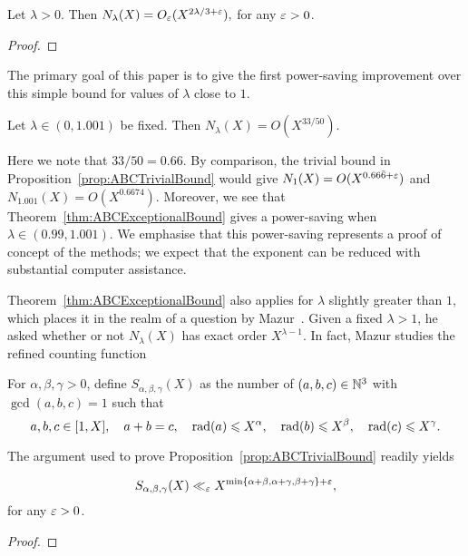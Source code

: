 \begin{proposition}\label{prop:ABCTrivialBound}
Let $\lambda>0$. Then
$
N_\lambda(X)=O_\varepsilon( X^{2\lambda/3+\varepsilon}),
$
for any $\varepsilon>0$.
\end{proposition}
\begin{proof}
\end{proof}


The primary goal of this paper is to give the first power-saving improvement over this simple bound for values of $\lambda$ close to $1$.


\begin{theorem}\label{thm:ABCExceptionalBound}
Let $\lambda\in (0, 1.001)$ be fixed. Then
$N_\lambda(X)=O( X^{33/50})$.
\end{theorem}

Here we note that $33/50=0.66$. By comparison, the trivial bound in Proposition~\ref{prop:ABCTrivialBound} would give $N_1(X)=O(X^{0.66\bar{6}+\varepsilon})$ and $N_{1.001}(X)=O(X^{0.6674})$.
Moreover, we see that Theorem~\ref{thm:ABCExceptionalBound} gives a power-saving when $\lambda\in (0.99,1.001)$. We emphasise that this power-saving represents a proof of concept of the methods; we expect that the exponent can be reduced with substantial computer assistance.


 Theorem~\ref{thm:ABCExceptionalBound} also applies for $\lambda$ slightly greater than $1$,
 which places it in the realm of a question by Mazur~\cite{mazur}.
Given a fixed $\lambda>1$, he asked whether or not
$ N_\lambda(X)$ has exact order
 $ X^{\lambda-1}$.
 In fact, Mazur studies
 the refined counting function

\begin{definition}\label{def:Sabc}
For $\alpha,\beta,\gamma>0$, define $S_{\alpha,\beta,\gamma}(X)$
as the number of
 $(a,b,c)\in \mathbb{N}^3$
with $\gcd(a,b,c)=1$ such that
 \[
 a,b,c\in [1,X], \quad a+b=c, \quad \operatorname{rad}(a)\leqslant X^\alpha, \quad
 \operatorname{rad}(b)\leqslant X^\beta, \quad
 \operatorname{rad}(c)\leqslant X^\gamma.
 \]
\end{definition}

The argument used to prove Proposition~\ref{prop:ABCTrivialBound} readily yields

\begin{lemma}\label{lem:TrivialBdforS}
\begin{equation}\label{eq:trivial}
 S_{\alpha,\beta,\gamma}(X)\ll_\varepsilon X^{\min\{\alpha+\beta , \alpha+\gamma , \beta+\gamma\}+\varepsilon},
\end{equation}
for any $\varepsilon>0$.
\end{lemma}
\begin{proof}
\end{proof}


